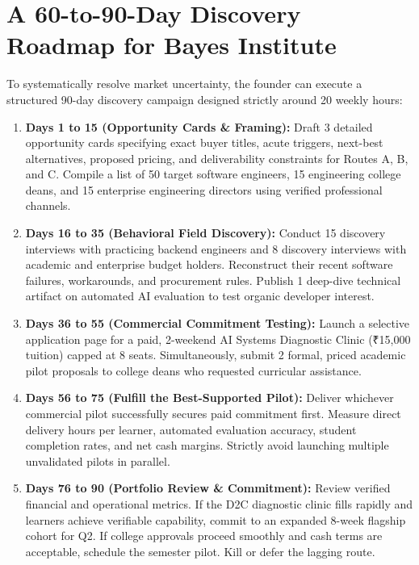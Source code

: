 \section{A 60-to-90-Day Discovery Roadmap for Bayes Institute}

To systematically resolve market uncertainty, the founder can execute a structured 90-day discovery campaign designed strictly around 20 weekly hours:

\begin{enumerate}[leftmargin=14pt,itemsep=3pt,topsep=2pt]
  \item \textbf{Days 1 to 15 (Opportunity Cards \& Framing):} Draft 3 detailed opportunity cards specifying exact buyer titles, acute triggers, next-best alternatives, proposed pricing, and deliverability constraints for Routes A, B, and C. Compile a list of 50 target software engineers, 15 engineering college deans, and 15 enterprise engineering directors using verified professional channels.
  \item \textbf{Days 16 to 35 (Behavioral Field Discovery):} Conduct 15 discovery interviews with practicing backend engineers and 8 discovery interviews with academic and enterprise budget holders. Reconstruct their recent software failures, workarounds, and procurement rules. Publish 1 deep-dive technical artifact on automated AI evaluation to test organic developer interest.
  \item \textbf{Days 36 to 55 (Commercial Commitment Testing):} Launch a selective application page for a paid, 2-weekend AI Systems Diagnostic Clinic (₹15,000 tuition) capped at 8 seats. Simultaneously, submit 2 formal, priced academic pilot proposals to college deans who requested curricular assistance.
  \item \textbf{Days 56 to 75 (Fulfill the Best-Supported Pilot):} Deliver whichever commercial pilot successfully secures paid commitment first. Measure direct delivery hours per learner, automated evaluation accuracy, student completion rates, and net cash margins. Strictly avoid launching multiple unvalidated pilots in parallel.
  \item \textbf{Days 76 to 90 (Portfolio Review \& Commitment):} Review verified financial and operational metrics. If the D2C diagnostic clinic fills rapidly and learners achieve verifiable capability, commit to an expanded 8-week flagship cohort for Q2. If college approvals proceed smoothly and cash terms are acceptable, schedule the semester pilot. Kill or defer the lagging route.
\end{enumerate}

